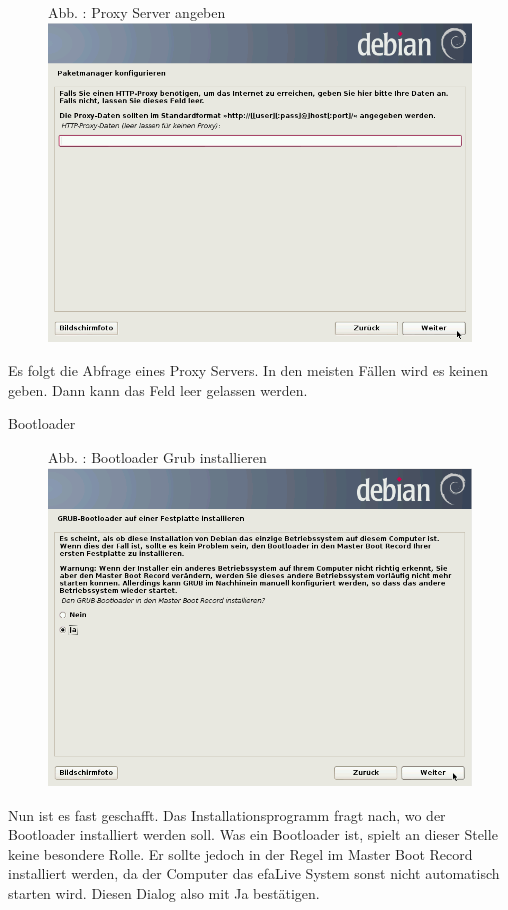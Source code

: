 \documentclass[a4paper,12pt,twoside]{article}
\newcounter{Abb}
\renewcommand\theAbb{\arabic{Abb}}
\begin{document}
\bigskip


\bigskip



\begin{figure}
\centering
\begin{minipage}{11.25cm}
Abb. \stepcounter{Abb}{\theAbb}: Proxy Server angeben
\includegraphics[width=11.25cm,height=8.461cm]{efaLivede-img/efaLivede-img16.png}\end{minipage}
\end{figure}
Es folgt die Abfrage eines Proxy Servers. In den meisten Fällen wird es
keinen geben. Dann kann das Feld leer gelassen werden.


\bigskip


\bigskip

Bootloader


\bigskip



\begin{figure}
\centering
\begin{minipage}{11.269cm}
Abb. \stepcounter{Abb}{\theAbb}: Bootloader Grub installieren
\includegraphics[width=11.269cm,height=8.456cm]{efaLivede-img/efaLivede-img17.png}\end{minipage}
\end{figure}
Nun ist es fast geschafft. Das Installationsprogramm fragt nach, wo der
Bootloader installiert werden soll. Was ein Bootloader ist, spielt an
dieser Stelle keine besondere Rolle. Er sollte jedoch in der Regel im
{\textquotedbl}Master Boot Record{\textquotedbl} installiert werden, da
der Computer das efaLive System sonst nicht automatisch starten wird.
Diesen Dialog also mit {\textquotedbl}Ja{\textquotedbl} bestätigen.
\end{document}
